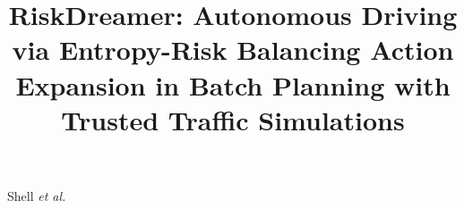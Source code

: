 \documentclass[journal]{IEEEtran}
\begin{document}
\title{RiskDreamer: Autonomous Driving via Entropy-Risk Balancing Action Expansion in Batch Planning with Trusted Traffic Simulations}

%
{Shell \MakeLowercase{\textit{et al.}} }

\maketitle



%
\IEEEpeerreviewmaketitle














\ifCLASSOPTIONcaptionsoff
  \newpage
\fi


{}

\end{document}

